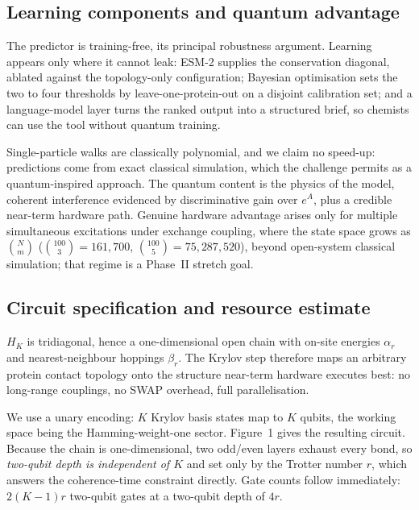 \documentclass[10pt,a4paper]{article}
\begin{document}
\subsection{Learning components and quantum advantage}

The predictor is training-free, its principal robustness argument. Learning appears only where it
cannot leak: ESM-2 supplies the conservation diagonal, ablated against the topology-only
configuration; Bayesian optimisation sets the two to four thresholds by leave-one-protein-out on a
disjoint calibration set; and a language-model layer turns the ranked output into a structured brief,
so chemists can use the tool without quantum training.

Single-particle walks are classically polynomial, and we claim no speed-up: predictions come from
exact classical simulation, which the challenge permits as a quantum-inspired approach. The quantum content is the physics of the model, coherent interference
evidenced by discriminative gain over $e^{A}$, plus a credible near-term hardware path. Genuine
hardware advantage arises only for multiple simultaneous excitations under exchange coupling, where
the state space grows as $\binom{N}{m}$ ($\binom{100}{3} = 161{,}700$, $\binom{100}{5} =
75{,}287{,}520$), beyond open-system classical simulation; that regime is a Phase~II stretch goal.

\subsection{Circuit specification and resource estimate}

$H_K$ is tridiagonal, hence a one-dimensional open chain with on-site energies $\alpha_r$ and
nearest-neighbour hoppings $\beta_r$. The Krylov step therefore maps an arbitrary protein contact
topology onto the structure near-term hardware executes best: no long-range couplings, no SWAP overhead, full parallelisation.

We use a unary encoding: $K$ Krylov basis states map to $K$ qubits, the working space being the
Hamming-weight-one sector. Figure~1 gives the resulting circuit. Because the chain is
one-dimensional, two odd/even layers exhaust every bond, so \emph{two-qubit depth is independent of
$K$} and set only by the Trotter number $r$, which answers the coherence-time constraint directly. Gate counts follow immediately: $2(K-1)r$ two-qubit gates at a two-qubit depth of $4r$.
\end{document}
